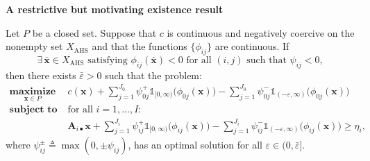 \documentclass[aspectratio=169,xcolor=dvipsnames]{beamer}
\begin{document}
\begin{frame}
  \footnotesize
  \setlength{\abovedisplayskip}{4pt}
  \setlength{\belowdisplayskip}{4pt}

  \textbf{A restrictive but motivating existence result}

  \vspace{0.04cm}
  Let $P$ be a closed set. Suppose that $c$ is continuous and negatively
  coercive on the nonempty set $X_{\mathrm{AHS}}$ and that the functions
  $\{\phi_{ij}\}$ are continuous. If
  \[
    \boxed{\exists\,\bar{\mathbf{x}}\in X_{\mathrm{AHS}}\text{ satisfying }
      \phi_{ij}(\bar{\mathbf{x}})<0\text{ for all }(i,j)\text{ such that }
      \psi_{ij}<0,}
  \]
  then there exists $\bar{\varepsilon}>0$ such that the problem:
  \[
    \begin{aligned}
      \operatorname*{\textbf{maximize}}_{\mathbf{x}\in P}\ \
      &c(\mathbf{x})+\sum_{j=1}^{J_0}\psi_{0j}^+\mathds{1}_{[0,\infty)}
        \bigl(\phi_{0j}(\mathbf{x})\bigr)
        -\sum_{j=1}^{J_0}\psi_{0j}^-\mathds{1}_{(-\varepsilon,\infty)}
        \bigl(\phi_{0j}(\mathbf{x})\bigr)\\[2pt]
      \operatorname*{\textbf{subject to}}\ \ &\text{for all }i=1,\ldots,I:\\[2pt]
      &\mathbf{A}_{i\bullet}\mathbf{x}+\sum_{j=1}^{J_i}\psi_{ij}^+
        \mathds{1}_{[0,\infty)}\bigl(\phi_{ij}(\mathbf{x})\bigr)
        -\sum_{j=1}^{J_i}\psi_{ij}^-\mathds{1}_{(-\varepsilon,\infty)}
        \bigl(\phi_{ij}(\mathbf{x})\bigr)\geq\eta_i,
    \end{aligned}
  \]
  where $\psi_{ij}^\pm\triangleq\max(0,\pm\psi_{ij})$, has an optimal solution
  for all $\varepsilon\in(0,\bar{\varepsilon}]$.
\end{frame}
\end{document}
